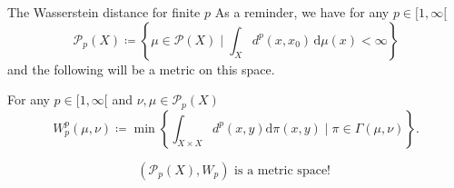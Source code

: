 \documentclass[10pt]{beamer}
\theoremstyle{reminder}
\begin{document}

\begin{frame}{The Wasserstein distance for finite $p$} 
    As a reminder, we have for any $p \in [1,\infty[$
    $$\mathcal{P}_p(X) \coloneqq \left\{\mu \in \mathcal{P}(X) \mid \int_X d^p(x, x_0) \, \mathrm{d}\mu(x) < \infty \right\}$$ and the following will be a metric on this space. 
    \begin{definition}
        For any $p \in [1,\infty[$ and $\nu,\mu \in \mathcal{P}_p(X)$
        $$W_p^p(\mu,\nu) \coloneqq \min \left\{\int_{X\times X}d^p(x,y)\mathrm{d}\pi(x,y) \mid \pi\in\Gamma(\mu,\nu)\right\}.$$
    \end{definition}
    \begin{theorem}
        $$(\mathcal{P}_p(X), W_p) \text{ is a metric space! }$$
    \end{theorem}
\end{frame}
\end{document}
